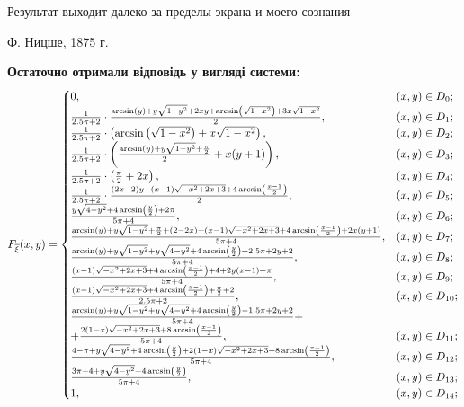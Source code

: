 \documentclass[14pt,a4paper]{scrartcl}
\theoremstyle{definition}
\theoremstyle{remark}
\theoremstyle{definition}
\theoremstyle{definition}
\begin{document}
\newpage

\epigraph{ Результат выходит далеко за пределы экрана и моего сознания}{Ф. Ницше, 1875 г.}
\textbf{Остаточно отримали відповідь у вигляді системи:}
$$
F_{\overline{\xi}}(x,y) = \begin{cases}
	0, & (x,y) \in D_{0};\\
	\frac{1}{2.5\pi + 2} \cdot \frac{\arcsin\left(y\right)+y\sqrt{1-y^2}+2xy+\arcsin\left(\sqrt{1-x^2}\right)+3x\sqrt{1-x^2}}{2} , & (x,y) \in D_{1};\\
	 \frac{1}{2.5\pi + 2} \cdot \left( \arcsin\left(\sqrt{1-x^2}\right)+x\sqrt{1-x^2} \right), & (x,y) \in D_{2};\\
	 \frac{1}{2.5\pi + 2} \cdot \left( \frac{\arcsin\left(y\right)+y\sqrt{1-y^2} + \frac{\pi}{2} }{2}+ x(y+1)\right), & (x,y) \in D_{3};\\
	 \frac{1}{2.5\pi + 2} \cdot \left( \frac{\pi}{2}+ 2x\right), & (x,y) \in D_{4};\\
	 \frac{1}{2.5\pi + 2} \cdot \frac{\left(2x-2\right)y+\left(x-1\right)\sqrt{-x^2+2x+3}+4\arcsin\left(\frac{x-1}{2}\right)}{2}, & (x,y) \in D_{5};\\
	 \frac{y\sqrt{4 - y^2} + 4\arcsin\left(\frac{y}{2}\right) + 2\pi }{5\pi +4}, & (x,y) \in D_{6};\\
	 \frac{\arcsin\left(y\right)+y\sqrt{1-y^2} + \frac{\pi}{2} + \left(2-2x\right)+\left(x-1\right)\sqrt{-x^2+2x+3}+4\arcsin\left(\frac{x-1}{2}\right)+ 2x(y+1)}{5\pi + 4},& (x,y) \in D_{7};\\
	 \frac{\arcsin\left(y\right)+y\sqrt{1-y^2} + y\sqrt{4-y^2}+4\arcsin\left(\frac{  y }{2}\right) + 2.5\pi + 2y + 2}{5\pi + 4},& (x,y) \in D_{8};\\
	 \frac{\left(x-1\right)\sqrt{-x^2+2x+3}+4\arcsin\left(\frac{x-1}{2}\right)+4 +2y(x-1) +\pi}{5\pi + 4},& (x,y) \in D_{9};\\
	 \frac{\left(x-1\right)\sqrt{-x^2+2x+3}+4\arcsin\left(\frac{x-1}{2}\right) + \frac{\pi}{2} + 2 }{2.5\pi + 2},& (x,y) \in D_{10};\\
	 \frac{\arcsin\left(y\right)+y\sqrt{1-y^2}+  y  \sqrt{4-y^2}+4\arcsin\left(\frac{y}{2}\right)-  1.5\pi + 2y + 2 }{5\pi + 4}+ \\
	 	 +\frac{2\left(1-x\right)\sqrt{-x^2+2x+3}+8\arcsin\left(\frac{x-1}{2}\right) }{5\pi + 4},& (x,y) \in D_{11};\\
		 \frac{ 4-\pi + y\sqrt{4-y^2}+4\arcsin\left(\frac{y}{2} \right) +2\left(1-x\right)\sqrt{-x^2+2x+3}+8\arcsin\left(\frac{x-1}{2}\right) }{5\pi + 4},& (x,y) \in D_{12};\\
		 \frac{3\pi + 4 + y\sqrt{4-y^2}+4\arcsin\left(\frac{y}{2} \right)}{5\pi + 4},& (x,y) \in D_{13};\\
		 1, & (x,y) \in D_{14};\\
\end{cases}
$$
\end{document}
